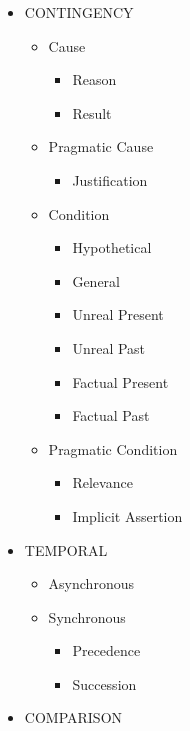 \documentclass{KBook}
\begin{document}
\begin{figure}[!ht]
	\centering
\begin{minipage}{.3\textwidth}
	\scriptsize\bfseries
\begin{itemize}
	\item CONTINGENCY
	\begin{itemize}
		\item Cause
		\begin{itemize}
			\item Reason
			\item Result
		\end{itemize}
		\item Pragmatic Cause
		\begin{itemize}
			\item Justification
		\end{itemize}
		\item Condition
		\begin{itemize}
			\item Hypothetical
			\item General
			\item Unreal Present
			\item Unreal Past
			\item Factual Present
			\item Factual Past
		\end{itemize}
		\item Pragmatic Condition
		\begin{itemize}
			\item Relevance
			\item Implicit Assertion
		\end{itemize}
	\end{itemize}
\end{itemize}
\end{minipage}
\begin{minipage}{.3\textwidth}
	\scriptsize\bfseries
\begin{itemize}
	\item TEMPORAL
	\begin{itemize}
		\item Asynchronous
		\item Synchronous
		\begin{itemize}
			\item Precedence
			\item Succession
		\end{itemize}
	\end{itemize}
	\item COMPARISON

\end{itemize}
\end{minipage}
\end{figure}
\end{document}
